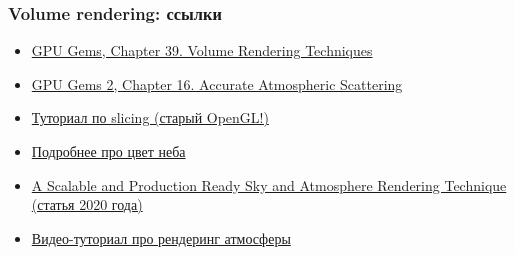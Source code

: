 \documentclass{beamer}
\begin{document}
\begin{frame}[fragile]
\frametitle{Volume rendering: ссылки}
\begin{itemize}
\item \href{https://developer.nvidia.com/gpugems/gpugems/part-vi-beyond-triangles/chapter-39-volume-rendering-techniques}{GPU Gems, Chapter 39. Volume Rendering Techniques}
\item \href{https://developer.nvidia.com/gpugems/gpugems2/part-ii-shading-lighting-and-shadows/chapter-16-accurate-atmospheric-scattering}{GPU Gems 2, Chapter 16. Accurate Atmospheric Scattering}
\item \href{https://www.codeproject.com/Articles/352270/Getting-Started-with-Volume-Rendering-using-OpenGL}{Туториал по slicing (старый OpenGL!)}
\item \href{https://www.scratchapixel.com/lessons/procedural-generation-virtual-worlds/simulating-sky/simulating-colors-of-the-sky}{Подробнее про цвет неба}
\item \href{https://sebh.github.io/publications/egsr2020.pdf}{A Scalable and Production Ready Sky and Atmosphere Rendering Technique (статья 2020 года)}
\item \href{https://www.youtube.com/watch?v=DxfEbulyFcY}{Видео-туториал про рендеринг атмосферы}
\end{itemize}
\end{frame}
\end{document}
